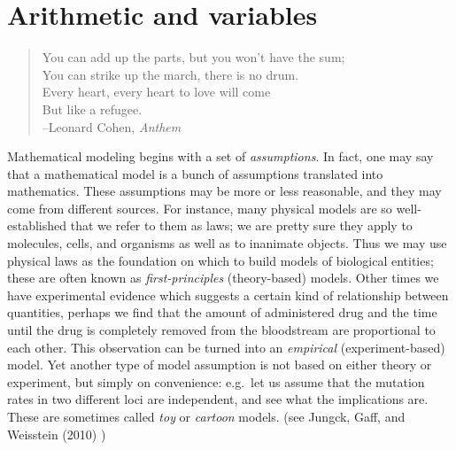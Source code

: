 \documentclass[
  letterpaper,
  DIV=11,
  numbers=noendperiod]{scrreprt}
\begin{document}

\hypertarget{arithmetic-and-variables}{%
\chapter{Arithmetic and variables}\label{arithmetic-and-variables}}

\begin{quote}
You can add up the parts, but you won't have the sum;\\
You can strike up the march, there is no drum.\\
Every heart, every heart to love will come\\
But like a refugee.\\
--Leonard Cohen, \emph{Anthem}
\end{quote}

Mathematical modeling begins with a set of \emph{assumptions}. In fact,
one may say that a mathematical model is a bunch of assumptions
translated into mathematics. These assumptions may be more or less
reasonable, and they may come from different sources. For instance, many
physical models are so well-established that we refer to them as laws;
we are pretty sure they apply to molecules, cells, and organisms as well
as to inanimate objects. Thus we may use physical laws as the foundation
on which to build models of biological entities; these are often known
as \emph{first-principles} (theory-based) models. Other times we have
experimental evidence which suggests a certain kind of relationship
between quantities, perhaps we find that the amount of administered drug
and the time until the drug is completely removed from the bloodstream
are proportional to each other. This observation can be turned into an
\emph{empirical} (experiment-based) model. Yet another type of model
assumption is not based on either theory or experiment, but simply on
convenience: e.g.~let us assume that the mutation rates in two different
loci are independent, and see what the implications are. These are
sometimes called \emph{toy} or \emph{cartoon} models. (see Jungck, Gaff,
and Weisstein (2010) )
\end{document}
